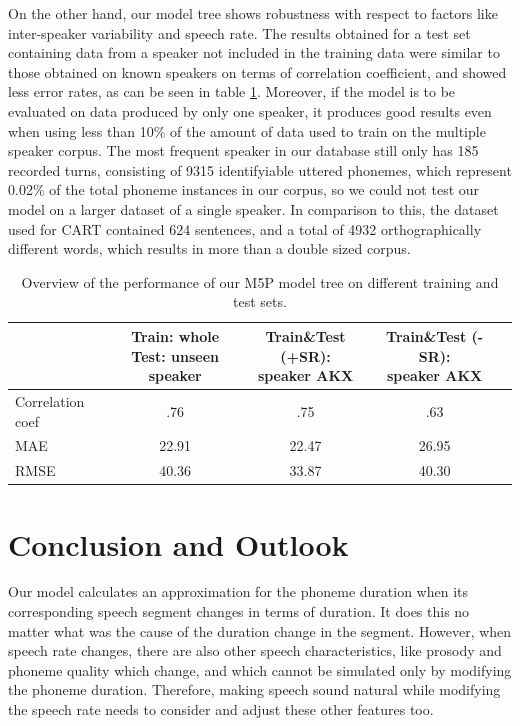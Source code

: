 \documentclass[11pt,a4paper]{scrbook}
\begin{document}
On the other hand, our model tree shows robustness with respect to factors like inter-speaker variability and speech rate. The results obtained for a test set containing data from a speaker not included in the training data were similar to those obtained on known speakers on terms of correlation coefficient, and showed less error rates, as can be seen in table \ref{tab:perfM5P}. Moreover, if the model is to be evaluated on data produced by only one speaker, it produces good results even when using less than 10\% of the amount of data used to train on the multiple speaker corpus. The most frequent speaker in our database still only has 185 recorded turns, consisting of 9315 identifyiable uttered phonemes, which represent 0.02\% of the total phoneme instances in our corpus, so we could not test our model on a larger dataset of a single speaker. In comparison to this, the dataset used for CART contained 624 sentences, and a total of 4932 orthographically different words, which results in more than a double sized corpus.

\begin{table}[htbp]
\centering
\begin{tabular}{|l|c|c|c|c|}

\hline
	 & \shortstack{Train: whole \\ Test: unseen speaker} & \shortstack{Train\&Test (+SR): \\ speaker AKX} & \shortstack{Train\&Test (-SR): \\ speaker AKX} \\ 
\hline
\hline
Correlation coef 		& .76   & .75 & .63 \\
	\hline
MAE  &  22.91 & 22.47 & 26.95 \\
	\hline
RMSE  &  40.36 & 33.87 & 40.30 \\
	\hline

\end{tabular}
\caption{Overview of the performance of our M5P model tree on different training and test sets.} 
\label{tab:perfM5P}
\end{table}

\chapter{Conclusion and Outlook}
Our model calculates an approximation for the phoneme duration when its corresponding speech segment changes in terms of duration. It does this no matter what was the cause of the duration change in the segment. However, when speech rate changes, there are also other speech characteristics, like prosody and phoneme quality which change, and which cannot be simulated only by modifying the phoneme duration. Therefore, making speech sound natural while modifying the speech rate needs to consider and adjust these other features too.
\end{document}
